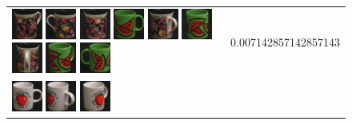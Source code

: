 {\begin{figure}[p]
\begin{tabular}{m{11cm} | m{3cm} |}
\includegraphics[width=1cm]{coil/beeld-63.eps}
\includegraphics[width=1cm]{coil/beeld-61.eps}
\includegraphics[width=1cm]{coil/beeld-62.eps}
\includegraphics[width=1cm]{coil/beeld-30.eps}
\includegraphics[width=1cm]{coil/beeld-64.eps}
\includegraphics[width=1cm]{coil/beeld-32.eps}
\includegraphics[width=1cm]{coil/beeld-65.eps}
\includegraphics[width=1cm]{coil/beeld-33.eps}
\includegraphics[width=1cm]{coil/beeld-31.eps}
& {\scriptsize 0.007142857142857143}
\\
\includegraphics[width=1cm]{coil/beeld-36.eps}
\includegraphics[width=1cm]{coil/beeld-40.eps}
\includegraphics[width=1cm]{coil/beeld-39.eps}

\end{tabular}
\end{figure}}
